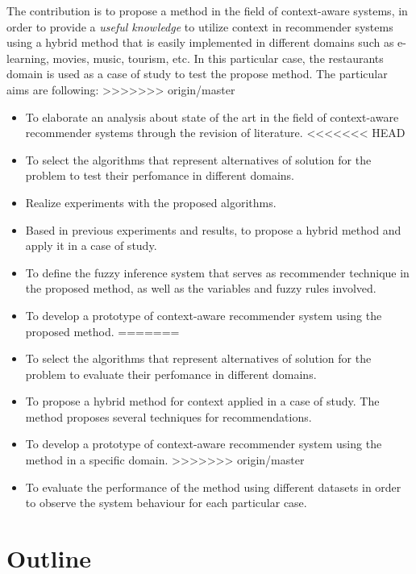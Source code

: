 The contribution is to propose a method in the field of
context-aware systems, in order to provide a
\textit{useful knowledge} to utilize context in recommender systems
using a hybrid method that is easily implemented in different domains
such as e-learning, movies, music, tourism, etc. In this particular
case, the restaurants domain is used as a case of study to  test the
propose method. The particular aims are following:
>>>>>>> origin/master
\begin{itemize}  
\item To elaborate an analysis about state of the art in the field
of context-aware recommender systems through  the revision of
literature. 
<<<<<<< HEAD
\item To select the algorithms that represent alternatives of
solution for the problem to test their perfomance in different
domains.
\item Realize experiments with the proposed algorithms.
\item Based in previous experiments and results, to propose a hybrid method and apply it in a case of study.  
\item To define the fuzzy inference system that serves as recommender technique in the proposed method, as well as the variables and fuzzy rules involved.
\item To develop a prototype of context-aware recommender system 
using the proposed method.
=======
\item To select the algorithms that represent alternatives of 
solution for the problem to evaluate their perfomance in different domains.
\item To propose a hybrid method for context applied in a case of study.  
The method proposes several techniques for recommendations.
\item To develop a prototype of context-aware recommender system 
using the method in a specific domain.
>>>>>>> origin/master
\item To evaluate the performance of the method using 
different datasets in order to observe the system behaviour 
for each particular case.
\end{itemize} 

\section{Outline}

